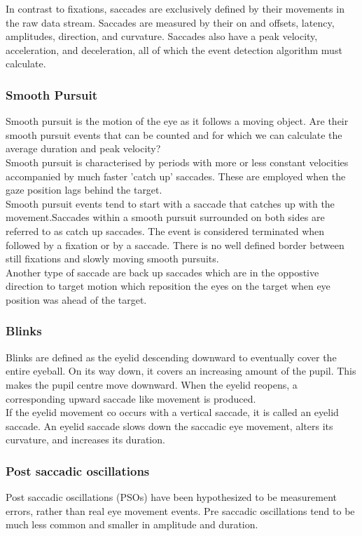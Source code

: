 \documentclass[12pt]{article}
\theoremstyle{definition}
\begin{document}
In contrast to fixations, saccades are exclusively defined by their movements in the raw data stream. Saccades are measured by their on and offsets, latency, amplitudes, direction, and curvature. Saccades also have a peak velocity, acceleration, and deceleration, all of which the event detection algorithm must calculate. 

\subsubsection{Smooth Pursuit}
Smooth pursuit is the motion of the eye as it follows a moving object. Are their smooth pursuit events that can be counted and for which we can calculate the average duration and peak velocity?\\

Smooth pursuit is characterised by periods with more or less constant velocities accompanied by much faster 'catch up' saccades. These are employed when the gaze position lags behind the target.\\

Smooth pursuit events tend to start with a saccade that catches up with the movement.Saccades within a smooth pursuit surrounded on both sides are referred to as catch up saccades. The event is considered terminated when followed by a fixation or by a saccade. There is no well defined border between still fixations and slowly moving smooth pursuits.\\

Another type of saccade are back up saccades which are in the oppostive direction to target motion which reposition the eyes on the target when eye position was ahead of the target. 

\subsubsection{Blinks}
Blinks are defined as the eyelid descending downward to eventually cover the entire eyeball. On its way down, it covers an increasing amount of the pupil. This makes the pupil centre move downward. When the eyelid reopens, a corresponding upward saccade like movement is produced.\\

If the eyelid movement co occurs with a vertical saccade, it is called an eyelid saccade. An eyelid saccade slows down the saccadic eye movement, alters its curvature, and increases its duration. 

\subsubsection{Post saccadic oscillations}
Post saccadic oscillations (PSOs) have been hypothesized to be measurement errors, rather than real eye movement events. Pre saccadic oscillations tend to be much less common and smaller in amplitude and duration.\\
\end{document}
